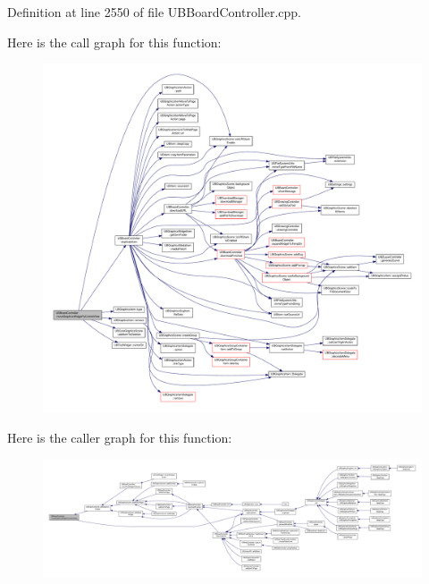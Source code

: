 Definition at line 2550 of file U\-B\-Board\-Controller.\-cpp.



Here is the call graph for this function\-:
\nopagebreak
\begin{figure}[H]
\begin{center}
\leavevmode
\includegraphics[width=350pt]{d7/d62/class_u_b_board_controller_af713d6e325369af244f2af8c90299a35_cgraph}
\end{center}
\end{figure}




Here is the caller graph for this function\-:
\nopagebreak
\begin{figure}[H]
\begin{center}
\leavevmode
\includegraphics[width=350pt]{d7/d62/class_u_b_board_controller_af713d6e325369af244f2af8c90299a35_icgraph}
\end{center}
\end{figure}


